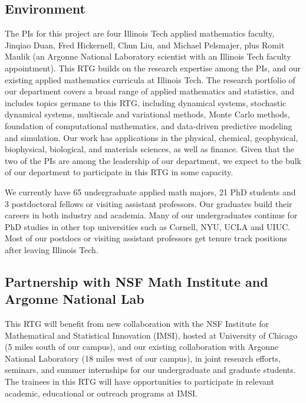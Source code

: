\documentclass[11pt]{NSFamsart}
\begin{document}
\subsection*{Environment} The PIs for this project are four Illinois Tech applied mathematics faculty,  Jinqiao Duan, Fred Hickernell, Chun Liu, and Michael Pelsmajer, plus Romit Maulik (an Argonne National Laboratory scientist with an Illinois Tech faculty appointment). This RTG builds on the research expertise among the PIs, and our existing applied mathematics curricula at Illinois Tech.  The research portfolio of our department covers a broad range of applied mathematics and statistics, and includes topics germane to this RTG, including dynamical systems, stochastic dynamical systems, multiscale and variational methods,  Monte Carlo methods, foundation of computational mathematics, and data-driven predictive modeling and simulation. Our work has applications in the physical, chemical, geophysical, biophysical, biological, and materials sciences, as well as finance.  Given that the two of the PIs are among the leadership of our department, we expect to the bulk of our department to participate in this RTG in some capacity.


We currently have 65 undergraduate applied math majors, 21 PhD students and 3 postdoctoral fellows or visiting assistant professors. Our graduates build their careers in  both industry   and academia. Many of our undergraduates continue for PhD studies in other top universities such as Cornell, NYU, UCLA and UIUC. Most of our postdocs or visiting assistant professors get tenure track positions after leaving Illinois Tech.

  
 
 
\subsection*{Partnership with NSF Math Institute and Argonne National Lab}
This RTG will benefit from new collaboration with the NSF Institute for Mathematical and Statistical Innovation (IMSI), hosted at University of Chicago (5 miles south of our campus), and 
our existing collaboration with  Argonne National Laboratory (18 miles west of our campus),  in joint research   efforts, seminars, and summer internships for our undergraduate and graduate students. The trainees in this RTG will have opportunities to participate in relevant academic, educational or outreach programs at IMSI.
 
\end{document}
